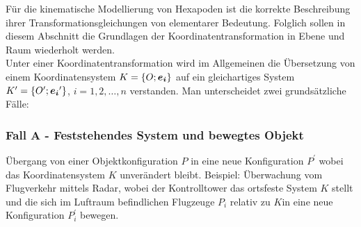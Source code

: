 Für die kinematische Modellierung von Hexapoden ist die korrekte Beschreibung ihrer Transformationsgleichungen von elementarer Bedeutung. Folglich sollen in diesem Abschnitt die Grundlagen der Koordinatentransformation in Ebene und Raum wiederholt werden. \\


Unter einer Koordinatentransformation wird im Allgemeinen die Übersetzung von einem Koordinatensystem $K = \{O;\boldsymbol{e_{i}}\}$ auf ein gleichartiges System $K^\prime = \{O^\prime;\boldsymbol{e_{i}}^\prime\}$, $i=1,2,\ldots,n$ verstanden. Man unterscheidet zwei grundsätzliche Fälle:

\subsubsection{Fall A - Feststehendes System und bewegtes Objekt} 
Übergang von einer Objektkonfiguration $P$ in eine neue Konfiguration $P^\prime$ wobei das Koordinatensystem $K$ unverändert bleibt. Beispiel: {\color{red}Überwachung vom Flugverkehr mittels Radar, wobei der Kontrolltower das ortsfeste System $K$ stellt und die sich im Luftraum befindlichen Flugzeuge $P_{i}$ relativ zu $K$in eine neue Konfiguration $P_{i}^\prime$ bewegen.}

